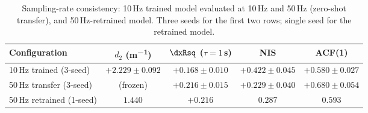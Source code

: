 \begin{table}[htbp]
  \centering
  \caption{Sampling-rate consistency: 10\,Hz trained model
    evaluated at 10\,Hz and 50\,Hz (zero-shot transfer),
    and 50\,Hz-retrained model.  Three seeds for the first
    two rows; single seed for the retrained model.}
  \label{tab:dt_consistency}
  \begin{tabular}{lcccc}
    \toprule
    Configuration & $d_2$ (\si{m^{-1}}) & $\dxRsq$ ($\tau{=}1$\,s) & NIS & ACF(1) \\
    \midrule
    10\,Hz trained (3-seed) & $+2.229 \pm 0.092$ & $+0.168 \pm 0.010$ & $+0.422 \pm 0.045$ & $+0.580 \pm 0.027$ \\
    50\,Hz transfer (3-seed) & (frozen) & $+0.216 \pm 0.015$ & $+0.229 \pm 0.040$ & $+0.680 \pm 0.054$ \\
    50\,Hz retrained (1-seed) & $1.440$ & $+0.216$ & $0.287$ & $0.593$ \\
    \bottomrule
  \end{tabular}
\end{table}